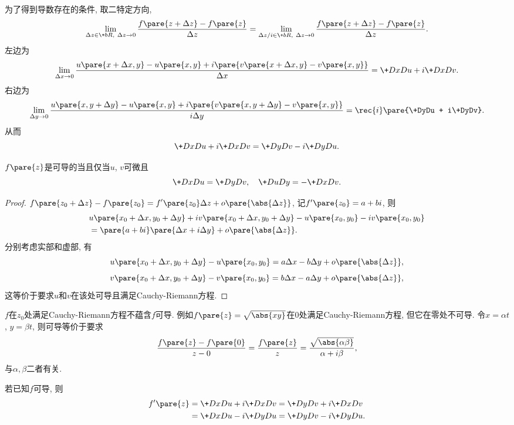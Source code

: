 \documentclass{ctexart}
\begin{document}
为了得到导数存在的条件, 取二特定方向,
\[ \lim_{\Delta z \in \+bR,\ \Delta z\rightarrow 0} \frac{f\pare{z+\Delta z} - f\pare{z}}{\Delta z} = \lim_{\Delta z/i \in \+bR,\ \Delta z \rightarrow 0} \frac{f\pare{z+\Delta z} - f\pare{z}}{\Delta z}. \]
左边为
\[ \lim_{\Delta x\rightarrow 0} \frac{u\pare{x+\Delta x, y} - u\pare{x,y} + i\pare{v\pare{x+\Delta x, y} - v\pare{x,y}}}{\Delta x} = \+DxDu + i\+DxDv. \]
右边为
\[ \lim_{\Delta y\rightarrow 0} \frac{u\pare{x, y + \Delta y} - u\pare{x,y} + i\pare{v\pare{x, y + \Delta y} - v\pare{x,y}}}{i \Delta y} = \rec{i}\pare{\+DyDu + i\+DyDv}. \]
从而
\[ \+DxDu + i\+DxDv = \+DyDv - i\+DyDu. \]
\begin{finale}
    \begin{theorem}
        $f\pare{z}$是可导的当且仅当$u$, $v$可微且
        \[ \+DxDu = \+DyDv,\quad \+DuDy = -\+DxDv. \]
    \end{theorem}
\end{finale}
\begin{proof}
    $\displaystyle f\pare{z_0+\Delta z} - f\pare{z_0} = f'\pare{z_0}\Delta z + o\pare{\abs{\Delta z}}$, 记$f'\pare{z_0} = a+bi$, 则
    \begin{align*}
        &u\pare{x_0+\Delta x, y_0+\Delta y} + iv\pare{x_0+\Delta x, y_0+\Delta y} - u\pare{x_0, y_0} - iv\pare{x_0,y_0} \\&= \pare{a+bi}\pare{\Delta x + i\Delta y} + o\pare{\abs{\Delta z}}. 
    \end{align*}
    分别考虑实部和虚部, 有
    \[ u\pare{x_0+\Delta x, y_0+\Delta y} - u\pare{x_0, y_0} = a\Delta x - b\Delta y + o\pare{\abs{\Delta z}}, \]
    \[ v\pare{x_0+\Delta x, y_0+\Delta y} - v\pare{x_0, y_0} = b\Delta x - a\Delta y + o\pare{\abs{\Delta z}}, \]
    这等价于要求$u$和$v$在该处可导且满足Cauchy-Riemann方程.
\end{proof}
\begin{remark}
    $f$在$z_0$处满足Cauchy-Riemann方程不蕴含$f$可导. 例如$f\pare{z} = \sqrt{\abs{xy}}$在$0$处满足Cauchy-Riemann方程, 但它在零处不可导. 令$x=\alpha t$, $y = \beta t$, 则可导等价于要求
    \[ \frac{f\pare{z} - f\pare{0}}{z-0} = \frac{f\pare{z}}{z} = \frac{\sqrt{\abs{\alpha\beta}}}{\alpha+i\beta}, \]
    与$\alpha,\beta$二者有关.
\end{remark}
\begin{theorem}[导数的表达式]
    若已知$f$可导, 则
    \begin{align*}
        f'\pare{z} &= \+DxDu + i\+DxDv = \+DyDv + i\+DxDv \\
        &= \+DxDu - i\+DyDu = \+DyDv - i\+DyDu.
    \end{align*}
\end{theorem}
\end{document}
